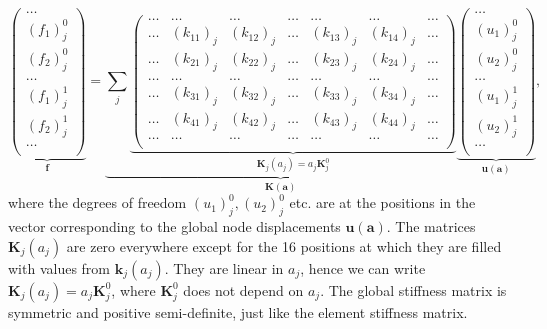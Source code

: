 \begin{equation}
    \underbrace{
    \begin{pmatrix}
        \dots \\ (f_1)^0_j \\ (f_2)^0_j \\ \dots \\ (f_1)^1_j \\ (f_2)^1_j \\ \dots \\
    \end{pmatrix}}_{\mathbf{f}}
    =
    \underbrace{
    \sum_j
    \underbrace{
    \begin{pmatrix}
    \dots & \dots & \dots & \dots & \dots & \dots & \dots \\
    \dots & (k_{11})_j & (k_{12})_j & \dots & (k_{13})_j & (k_{14})_j & \dots  \\
    \dots & (k_{21})_j & (k_{22})_j & \dots & (k_{23})_j & (k_{24})_j & \dots  \\
    \dots & \dots & \dots & \dots & \dots & \dots & \dots  \\
    \dots & (k_{31})_j & (k_{32})_j & \dots & (k_{33})_j & (k_{34})_j & \dots  \\
    \dots & (k_{41})_j & (k_{42})_j & \dots & (k_{43})_j & (k_{44})_j & \dots  \\
    \dots & \dots & \dots & \dots & \dots & \dots & \dots  \\
    \end{pmatrix}}_{\mathbf{K}_j (a_j) = a_j \mathbf{K}^0_j }
    }_{\mathbf{K}(\mathbf{a})}
    \underbrace{
    \begin{pmatrix}
        \dots \\ (u_1)^0_j \\ (u_2)^0_j \\ \dots \\ (u_1)^1_j \\ (u_2)^1_j \\ \dots \\
    \end{pmatrix}}_{\mathbf{u} (\mathbf{a})},
\end{equation}
where the degrees of freedom $(u_1)^0_j, (u_2)^0_j$ etc. are at the positions in the vector corresponding to the global node displacements $\mathbf{u} (\mathbf{a})$. The matrices $\mathbf{K}_j(a_j)$ are zero everywhere except for the 16 positions at which they are filled with values from $\mathbf{k}_j(a_j)$. They are linear in $a_j$, hence we can write $\mathbf{K}_j(a_j) = a_j \mathbf{K}^0_j$, where $\mathbf{K}^0_j$ does not depend on $a_j$.
The global stiffness matrix is symmetric and positive semi-definite, just like the element stiffness matrix.

